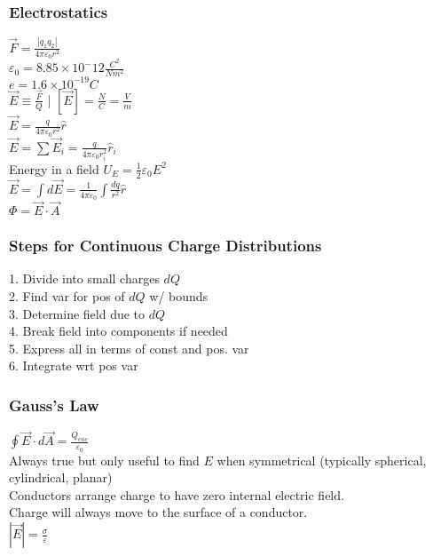 \subsubsection*{Electrostatics}
$\vec{F} = \frac{|q_1 q_2|}{4\pi \varepsilon_0 r^2}$\\
$\varepsilon_0 = 8.85 \times 10^-12 \frac{C^2}{Nm^2}$\\
$e = 1.6 \times 10^{-19} C$\\
$\vec{E} \equiv \frac{\vec{F}}{Q}$ | $[\vec{E}] = \frac{N}{C} = \frac{V}{m}$\\
$\vec{E} = \frac{q}{4\pi\varepsilon_0 r^2}\hat{r}$\\
$\vec{E} = \sum\vec{E}_i = \frac{q}{4\pi\varepsilon_0 r_i^2}\hat{r}_i$\\
Energy in a field $ U_E = \frac{1}{2}\varepsilon_0 E^2$\\
$\vec{E} = \int d\vec{E} =  \frac{1}{4\pi\varepsilon_0}\int\frac{dq}{r^2}\hat{r}$\\
$\Phi = \vec{E}\cdot \vec{A}$
\subsubsection*{Steps for Continuous Charge Distributions}
1. Divide into small charges $dQ$\\
2. Find var for pos of $dQ$ w/ bounds\\
3. Determine field due to $dQ$\\
4. Break field into components if needed\\
5. Express all in terms of const and pos. var\\
6. Integrate wrt pos var
\subsubsection*{Gauss's Law}

$\oint \vec{E}\cdot d\vec{A} = \frac{Q_{enc}}{\varepsilon_0}$\\
Always true but  only useful to find $E$ when symmetrical (typically
spherical, cylindrical, planar)\\
Conductors arrange charge to have zero internal electric field.\\
Charge will always move to the surface of a conductor.\\
$|\vec{E}| = \frac{\sigma}{\varepsilon}$

